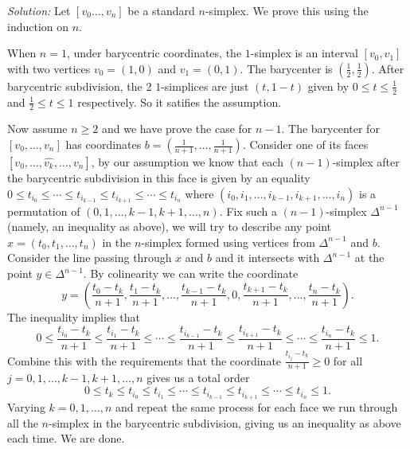 \documentclass[a4paper, 12pt]{article}
\newenvironment{solution}
    {\textit{Solution:}}
    {}
\begin{document}
\begin{solution}
Let \([v_0\ldots,v_n]\) be a standard \(n\)-simplex. We prove this using the induction on \(n\). 
\par 
When \(n=1\), under barycentric coordinates, the \(1\)-simplex is an interval \([v_0,v_1]\) with two vertices \(v_0=(1,0)\) and \(v_1=(0,1)\). The barycenter is \((\frac{1}{2},\frac{1}{2})\). After barycentric 
subdivision, the 2 \(1\)-simplices are just \((t,1-t)\) given by \(0\leq t\leq \frac{1}{2}\) and \(\frac{1}{2}\leq t\leq 1\) respectively. So it satifies the assumption. 
\par 
Now assume \(n\geq 2\) and we have prove the case for \(n-1\). The barycenter for \([v_0,\ldots,v_n]\) has coordinates \(b=(\frac{1}{n+1},\ldots,\frac{1}{n+1})\). Consider one of its faces \([v_0,\ldots,\hat{v_k},\ldots,v_n]\), by our assumption we know that 
each \((n-1)\)-simplex after the barycentric subdivision in this face is given by an equality \(0\leq t_{i_0}\leq \cdots\leq t_{i_{k-1}}\leq t_{i_{k+1}}\leq \cdots\leq t_{i_n}\) where \((i_0,i_1,\ldots,i_{k-1},i_{k+1},\ldots,i_n )\) is a permutation of \((0,1,\ldots,k-1,k+1,\ldots,n)\). Fix such a 
\((n-1)\)-simplex \(\Delta^{n-1}\) (namely, an inequality as above), we will try to describe any point \(x=(t_0,t_1,\ldots,t_n)\) in the \(n\)-simplex formed using vertices from \(\Delta^{n-1}\) and \(b\). Consider the line passing through \(x\) and \(b\) and it intersects with \(\Delta^{n-1}\) at the point \(y\in \Delta^{n-1}\). 
By colinearity we can write the coordinate 
\[y=(\frac{t_0-t_k}{n+1},\frac{t_1-t_k}{n+1},\ldots,\frac{t_{k-1}-t_k}{n+1},0,\frac{t_{k+1}-t_k}{n+1},\ldots,\frac{t_n-t_k}{n+1}).\]
The inequality implies that 
\[0\leq \frac{t_{i_0}-t_k}{n+1}\leq \frac{t_{i_1}-t_k}{n+1}\leq\cdots \leq\frac{t_{i_{k-1}}-t_k}{n+1}\leq \frac{t_{i_{k+1}}-t_k}{n+1}\leq \cdots\leq \frac{t_{i_n}-t_k}{n+1}\leq 1.\]
Combine this with the requirements that the coordinate \(\frac{t_{i_j}-t_k}{n+1}\geq 0\) for all \(j=0,1,\ldots,k-1,k+1,\ldots,n\) gives us a total order
\[0\leq t_k\leq t_{i_0}\leq t_{i_1}\leq \cdots\leq t_{i_{k-1}}\leq t_{i_{k+1}}\leq \cdots\leq t_{i_n}\leq 1.\]
Varying \(k=0,1,\ldots,n\) and repeat the same process for each face we run through all the \(n\)-simplex in the barycentric subdivision, giving us an inequality as above each time. We are done. 
\end{solution}
\end{document}
